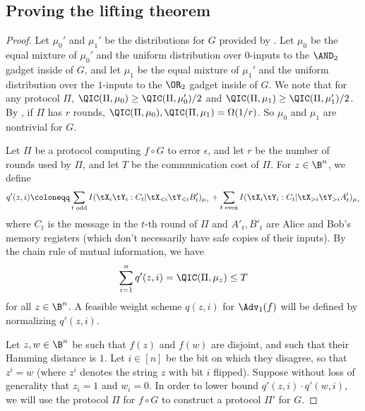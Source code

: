 \subsection{Proving the lifting theorem}

\Advliftformal*

\begin{proof}
Let $\mu_0'$ and $\mu_1'$ be the distributions
for $G$ provided by . Let $\mu_0$
be the equal mixture of $\mu_0'$ and the uniform distribution
over $0$-inputs to the $\AND_2$ gadget inside of $G$,
and let $\mu_1$ be the equal mixture of $\mu_1'$ and the
uniform distribution over the $1$-inputs to the $\OR_2$ gadget
inside of $G$. We note that for any protocol $\Pi$,
$\QIC(\Pi,\mu_0)\ge \QIC(\Pi,\mu_0')/2$ and
$\QIC(\Pi,\mu_1)\ge \QIC(\Pi,\mu_1')/2$. By \cite{BGK+18}, if $\Pi$ has $r$ rounds,
$\QIC(\Pi,\mu_0),\QIC(\Pi,\mu_1)=\Omega(1/r)$. So $\mu_0$ and $\mu_1$ are nontrivial for $G$.

Let $\Pi$ be a protocol computing $f\circ G$ to error $\epsilon$,
and let $r$ be the number of rounds used by $\Pi$,
and let $T$ be the communication cost of $\Pi$.
For $z\in\B^n$, we define 
\[ q'(z,i)\coloneqq \sum_{t \text{ odd}}I(\tX_i\tY_i:C_t|\tX_{<i}\tY_{<i}B'_t)_{\mu_z} + \sum_{t\text{ even}}I(\tX_i\tY_i:C_t|\tX_{>i}\tY_{>i}A'_t)_{\mu_z}\]
where $C_t$ is the message in the $t$-th round of $\Pi$ and $A'_t, B'_t$ are Alice and Bob's memory registers (which don't necessarily have safe copies of their inputs). By the chain rule of mutual information, we have
\[\sum_{i=1}^n q'(z,i) = \QIC(\Pi, \mu_z) \leq T\]
for all $z\in\B^n$. A feasible weight scheme $q(z,i)$ for $\Adv_1(f)$ will be defined by normalizing $q'(z,i)$.

Let $z,w\in\B^n$ be such that $f(z)$ and $f(w)$ are disjoint,
and such that their Hamming distance is $1$. Let
$i\in[n]$ be the bit on which they disagree, so that
$z^i=w$ (where $z^i$ denotes the string $z$ with bit $i$ flipped).
Suppose without loss of generality that $z_i=1$ and $w_i=0$.
In order to lower bound $q'(z,i)\cdot q'(w,i)$, we will use the protocol $\Pi$ for $f\circ G$ to construct a protocol $\Pi'$ for $G$.


\end{proof}
